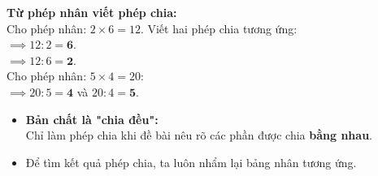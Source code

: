 \documentclass[11pt,a4paper]{article}
\begin{document}
\vspace{-1.5mm}
\noindent
\begin{minipage}[t]{0.49\textwidth}\vspace{0pt}
\begin{tcolorbox}[
  enhanced,
  colback=green!4!white,
  colframe=green!60!black,
  arc=2mm, boxrule=0.8pt,
  left=2mm, right=2mm, top=1.8mm, bottom=1.8mm,
  title={\footnotesize\bfseries\color{white}\faCheckCircle\ 4. Ví dụ thực hành chuẩn mực}
]
{\footnotesize
\textbf{Từ phép nhân viết phép chia:}\\
Cho phép nhân: $2 \times 6 = 12$. Viết hai phép chia tương ứng:\\
$\implies 12 : 2 = \mathbf{6}$.\\
$\implies 12 : 6 = \mathbf{2}$.\\
Cho phép nhân: $5 \times 4 = 20$:\\
$\implies 20 : 5 = \mathbf{4}$ và $20 : 4 = \mathbf{5}$.
}
\end{tcolorbox}
\end{minipage}
\hfill
\begin{minipage}[t]{0.49\textwidth}\vspace{0pt}
\begin{tcolorbox}[
  enhanced,
  colback=red!4!white,
  colframe=red!75!black,
  arc=2mm, boxrule=0.8pt,
  left=2mm, right=2mm, top=1.8mm, bottom=1.8mm,
  title={\footnotesize\bfseries\color{white}\faExclamationTriangle\ 5. Mẹo tránh bẫy trắc nghiệm}
]
{\footnotesize
\begin{itemize}\setlength{\itemsep}{1pt}\setlength{\leftskip}{-2.5mm}
  \item \textbf{Bản chất là "chia đều":}\\
  Chỉ làm phép chia khi đề bài nêu rõ các phần được chia \textbf{bằng nhau}.
  \item Để tìm kết quả phép chia, ta luôn nhẩm lại bảng nhân tương ứng.
\end{itemize}
}
\end{tcolorbox}
\end{minipage}
\end{document}
